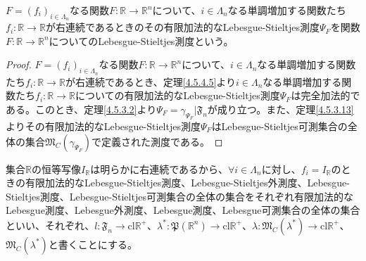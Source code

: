 \documentclass[dvipdfmx]{jsarticle}
\begin{document}
\begin{dfn}\label{Lebesgue-Stieltjes測度}
$F = \left( f_{i} \right)_{i \in \varLambda_{n}}$なる関数$F:\mathbb{R} \rightarrow \mathbb{R}^{n}$について、$i \in \varLambda_{n}$なる単調増加する関数たち$f_{i}:\mathbb{R} \rightarrow \mathbb{R}$が右連続であるときのその有限加法的なLebesgue-Stieltjes測度$\varPsi_{F}$を関数$F:\mathbb{R} \rightarrow \mathbb{R}^{n}$についてのLebesgue-Stieltjes測度という。
\end{dfn}
\begin{proof}
$F = \left( f_{i} \right)_{i \in \varLambda_{n}}$なる関数$F:\mathbb{R} \rightarrow \mathbb{R}^{n}$について、$i \in \varLambda_{n}$なる単調増加する関数たち$f_{i}:\mathbb{R} \rightarrow \mathbb{R}$が右連続であるとき、定理\ref{4.5.4.5}より$i \in \varLambda_{n}$なる単調増加する関数たち$f_{i}:\mathbb{R} \rightarrow \mathbb{R}$についての有限加法的なLebesgue-Stieltjes測度$\varPsi_{F}$は完全加法的である。このとき、定理\ref{4.5.3.2}より$\varPsi_{F} = \gamma_{\varPsi_{F}}|\mathfrak{F}_{n}$が成り立つ。また、定理\ref{4.5.3.13}よりその有限加法的なLebesgue-Stieltjes測度$\varPsi_{F}$はLebesgue-Stieltjes可測集合の全体の集合$\mathfrak{M}_{C}\left( \gamma_{\varPsi_{F}} \right)$で定義された測度である。
\end{proof}
\begin{dfn}\label{Lebesgue測度}
集合$\mathbb{R}$の恒等写像$I_{\mathbb{R}}$は明らかに右連続であるから、$\forall i \in \varLambda_{n}$に対し、$f_{i} = I_{\mathbb{R}}$のときの有限加法的なLebesgue-Stieltjes測度、Lebesgue-Stieltjes外測度、Lebesgue-Stieltjes測度、Lebesgue-Stieltjes可測集合の全体の集合をそれぞれ有限加法的なLebesgue測度、Lebesgue外測度、Lebesgue測度、Lebesgue可測集合の全体の集合といい、それぞれ、$l:\mathfrak{F}_{n} \rightarrow \mathrm{cl}\mathbb{R}^{+}$、$\lambda^{*}\mathfrak{:P}\left( \mathbb{R}^{n} \right) \rightarrow \mathrm{cl}\mathbb{R}^{+}$、$\lambda:\mathfrak{M}_{C}\left( \lambda^{*} \right) \rightarrow \mathrm{cl}\mathbb{R}^{+}$、$\mathfrak{M}_{C}\left( \lambda^{*} \right)$と書くことにする。
\end{dfn}
\end{document}

